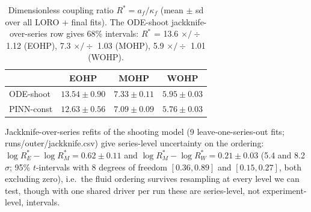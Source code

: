 \begin{table}[t]\centering\small
\caption{Dimensionless coupling ratio $R^*=a_f/\kappa_f$ (mean $\pm$ sd over all LORO + final fits).
The ODE-shoot jackknife-over-series row gives 68\% intervals: $R^*$ = 13.6 $\times/\div$ 1.12 (EOHP),
7.3 $\times/\div$ 1.03 (MOHP), 5.9 $\times/\div$ 1.01 (WOHP).}
\label{tab:rstar}
\begin{tabular}{lccc}
\toprule
 & EOHP & MOHP & WOHP \\
\midrule
ODE-shoot    & $13.54\pm0.90$ & $7.33\pm0.11$ & $5.95\pm0.03$ \\
PINN-const   & $12.63\pm0.56$ & $7.09\pm0.09$ & $5.76\pm0.03$ \\
\bottomrule
\end{tabular}
\end{table}

Jackknife-over-series refits of the shooting model (9 leave-one-series-out fits; runs/outer/jackknife.csv)
give series-level uncertainty on the ordering: $\log R^*_E - \log R^*_M = 0.62 \pm 0.11$ and
$\log R^*_M - \log R^*_W = 0.21 \pm 0.03$ (5.4 and 8.2 $\sigma$; 95\% $t$-intervals with 8 degrees of
freedom $[0.36, 0.89]$ and $[0.15, 0.27]$, both excluding zero), i.e.\ the fluid ordering survives
resampling at every level we can test, though with one shared driver per run these are series-level,
not experiment-level, intervals.

